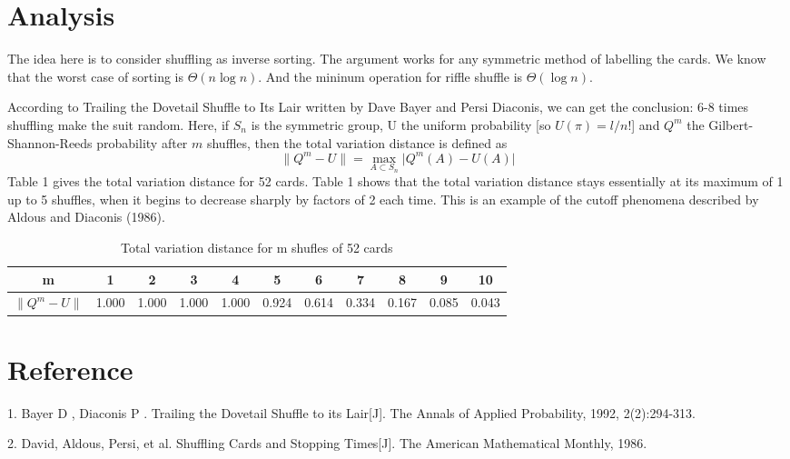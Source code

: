 \documentclass{article}
\begin{document}
\section{Analysis}
The idea here is to consider shuffling as inverse sorting. The argument works for any symmetric method of labelling the cards. We know that the worst case of sorting is $\Theta(n \log n)$. And the mininum operation for riffle shuffle is $\Theta(\log n)$.

According to Trailing the Dovetail Shuffle to Its Lair written by Dave Bayer and Persi Diaconis, we can get the conclusion: 6-8 times shuffling make the suit random.
 Here, if $S_n$ is the symmetric group, U the uniform probability [so $U(\pi) = l/n!$] and $Q^m$ the Gilbert-Shannon-Reeds probability after $m$ shuffles, then the total variation distance is defined as 
 $$\lVert Q^m-U\rVert=\max_{A\subset S_n}\lvert Q^m(A)-U(A)\rvert$$
Table 1 gives the total variation distance for 52 cards. Table 1 shows that the total variation distance stays essentially at its maximum of 1 up to 5 shuffles, when it begins to decrease sharply by factors of 2 each time. This is an example of the cutoff phenomena described by Aldous and Diaconis (1986). 
\begin{table}[h]
\caption{Total variation distance for m shufles of 52 cards}
\label{tab:1}       %
\begin{tabular}{ccccccccccc}
\hline
m & 1 & 2 & 3 & 4 & 5 & 6 & 7 & 8 & 9 & 10  \\
\hline
$\lVert Q^m-U\rVert$ & 1.000 & 1.000 & 1.000 & 1.000 & 0.924 & 0.614 & 0.334 & 0.167 & 0.085 & 0.043  \\
\hline
\end{tabular}
\end{table}

\section {Reference}
1. Bayer D , Diaconis P . Trailing the Dovetail Shuffle to its Lair[J]. The Annals of Applied Probability, 1992, 2(2):294-313.

2. David, Aldous, Persi, et al. Shuffling Cards and Stopping Times[J]. The American Mathematical Monthly, 1986.
\end{document}
